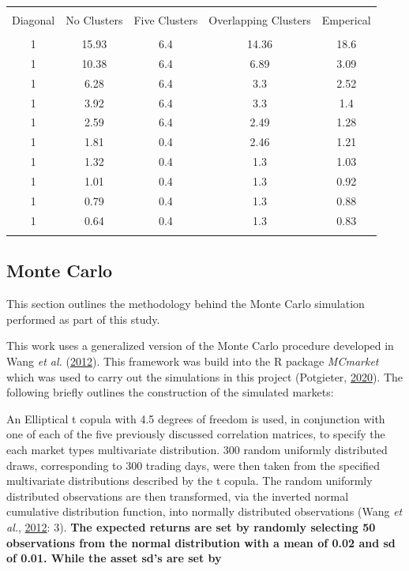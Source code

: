 \documentclass[11pt,preprint, authoryear]{elsarticle}
\let\origtable\table
\let\endorigtable\endtable
\renewenvironment{table}[1][2] {
    \expandafter\origtable\expandafter[H]
} {
    \endorigtable
}
\numberwithin{equation}{section}
\numberwithin{figure}{section}
\numberwithin{table}{section}
\begin{document}
\begin{table}[!htbp] \centering 
  \caption{Eigenvalues} 
  \label{eigens} 
\begin{tabular}{@{\extracolsep{5pt}} ccccc} 
\\[-1.8ex]\hline 
\hline \\[-1.8ex] 
Diagonal & No Clusters & Five Clusters & Overlapping Clusters & Emperical \\ 
\hline \\[-1.8ex] 
1 & 15.93 & 6.4 & 14.36 & 18.6 \\ 
1 & 10.38 & 6.4 & 6.89 & 3.09 \\ 
1 & 6.28 & 6.4 & 3.3 & 2.52 \\ 
1 & 3.92 & 6.4 & 3.3 & 1.4 \\ 
1 & 2.59 & 6.4 & 2.49 & 1.28 \\ 
1 & 1.81 & 0.4 & 2.46 & 1.21 \\ 
1 & 1.32 & 0.4 & 1.3 & 1.03 \\ 
1 & 1.01 & 0.4 & 1.3 & 0.92 \\ 
1 & 0.79 & 0.4 & 1.3 & 0.88 \\ 
1 & 0.64 & 0.4 & 1.3 & 0.83 \\ 
\hline \\[-1.8ex] 
\end{tabular} 
\end{table}

\hypertarget{monte-carlo}{%
\subsection{Monte Carlo}\label{monte-carlo}}

This section outlines the methodology behind the Monte Carlo simulation
performed as part of this study.

This work uses a generalized version of the Monte Carlo procedure
developed in Wang \emph{et al.}
(\protect\hyperlink{ref-wang2012}{2012}). This framework was build into
the R package \emph{MCmarket} which was used to carry out the
simulations in this project (Potgieter,
\protect\hyperlink{ref-MCmarket}{2020}). The following briefly outlines
the construction of the simulated markets:

An Elliptical t copula with 4.5 degrees of freedom is used, in
conjunction with one of each of the five previously discussed
correlation matrices, to specify the each market types multivariate
distribution. 300 random uniformly distributed draws, corresponding to
300 trading days, were then taken from the specified multivariate
distributions described by the t copula. The random uniformly
distributed observations are then transformed, via the inverted normal
cumulative distribution function, into normally distributed observations
(Wang \emph{et al.}, \protect\hyperlink{ref-wang2012}{2012}: 3).
\textbf{The expected returns are set by randomly selecting 50
observations from the normal distribution with a mean of 0.02 and sd of
0.01. While the asset sd's are set by }
\end{document}
